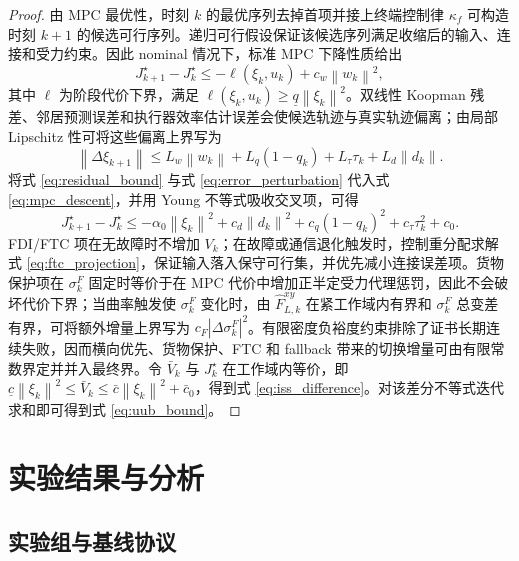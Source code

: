 \documentclass[twocolumn,3p,times,procedia]{elsarticle}
\newcommand{\norm}[1]{\left\lVert #1 \right\rVert}
\begin{document}
\begin{proof}
由 MPC 最优性，时刻 $k$ 的最优序列去掉首项并接上终端控制律 $\kappa_f$ 可构造时刻 $k+1$ 的候选可行序列。递归可行假设保证该候选序列满足收缩后的输入、连接和受力约束。因此 nominal 情况下，标准 MPC 下降性质给出
\begin{equation}
J_{k+1}^\star-J_k^\star\le -\ell(\xi_k,u_k)+c_w\norm{w_k}^2 ,
\label{eq:mpc_descent}
\end{equation}
其中 $\ell$ 为阶段代价下界，满足 $\ell(\xi_k,u_k)\ge \underline q\norm{\xi_k}^2$。双线性 Koopman 残差、邻居预测误差和执行器效率估计误差会使候选轨迹与真实轨迹偏离；由局部 Lipschitz 性可将这些偏离上界写为
\begin{equation}
\norm{\Delta \xi_{k+1}}\le L_w\norm{w_k}+L_q(1-q_k)+L_\tau\tau_k+L_d\norm{d_k}.
\label{eq:error_perturbation}
\end{equation}
将式 \eqref{eq:residual_bound} 与式 \eqref{eq:error_perturbation} 代入式 \eqref{eq:mpc_descent}，并用 Young 不等式吸收交叉项，可得
\begin{equation}
J_{k+1}^\star-J_k^\star\le -\alpha_0\norm{\xi_k}^2+c_d\norm{d_k}^2+c_q(1-q_k)^2+c_\tau\tau_k^2+c_0 .
\label{eq:descent_with_disturbance}
\end{equation}
FDI/FTC 项在无故障时不增加 $V_k$；在故障或通信退化触发时，控制重分配求解式 \eqref{eq:ftc_projection}，保证输入落入保守可行集，并优先减小连接误差项。货物保护项在 $\sigma_k^F$ 固定时等价于在 MPC 代价中增加正半定受力代理惩罚，因此不会破坏代价下界；当曲率触发使 $\sigma_k^F$ 变化时，由 $\hat F_{L,k}^{xy}$ 在紧工作域内有界和 $\sigma_k^F$ 总变差有界，可将额外增量上界写为 $c_F|\Delta\sigma_k^F|^2$。有限密度负裕度约束排除了证书长期连续失败，因而横向优先、货物保护、FTC 和 fallback 带来的切换增量可由有限常数界定并并入最终界。令 $\bar V_k$ 与 $J_k^\star$ 在工作域内等价，即 $\underline c\norm{\xi_k}^2\le \bar V_k\le \bar c\norm{\xi_k}^2+\bar c_0$，得到式 \eqref{eq:iss_difference}。对该差分不等式迭代求和即可得到式 \eqref{eq:uub_bound}。
\end{proof}


\section{实验结果与分析}

\subsection{实验组与基线协议}
\end{document}
